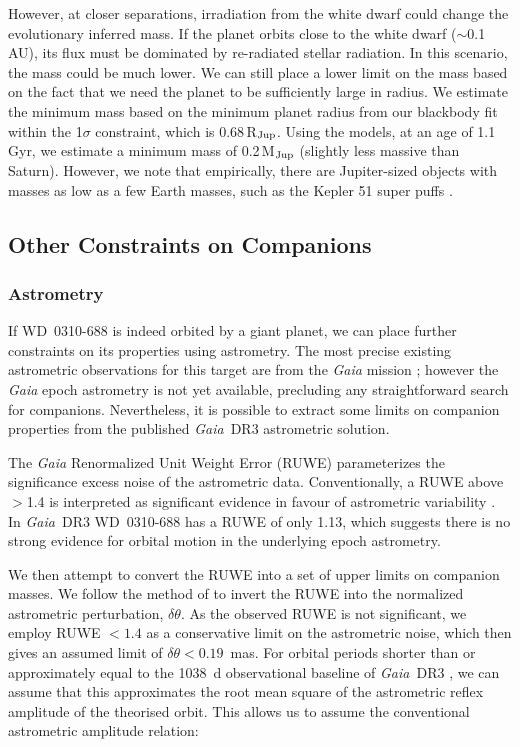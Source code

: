 \documentclass[twocolumn]{aastex631}
\begin{document}
However, at closer separations, irradiation from the white dwarf could change the evolutionary inferred mass. If the planet orbits close to the white dwarf ($\sim$0.1\,AU), its flux must be dominated by re-radiated stellar radiation. In this scenario, the mass could be much lower. We can still place a lower limit on the mass based on the fact that we need the planet to be sufficiently large in radius. We estimate the minimum mass based on the minimum planet radius from our blackbody fit within the 1$\sigma$ constraint, which is 0.68\,R$_{\rm Jup}$. Using the \cite{2019A&A...623A..85L} models, at an age of 1.1\,Gyr, we estimate a minimum mass of 0.2\,M$_{\rm Jup}$ (slightly less massive than Saturn). However, we note that empirically, there are Jupiter-sized objects with masses as low as a few Earth masses, such as the Kepler 51 super puffs \citep{2014ApJ...783...53M,2020AJ....159...57L}.



 

\subsection{Other Constraints on Companions}

\subsubsection{Astrometry}

If WD~0310-688 is indeed orbited by a giant planet, we can place further constraints on its properties using astrometry. The most precise existing astrometric observations for this target are from the \textit{Gaia} mission \citep{Gaia}; however the \textit{Gaia} epoch astrometry is not yet available, precluding any straightforward search for companions. Nevertheless, it is possible to extract some limits on companion properties from the published \textit{Gaia}~DR3 astrometric solution.

The \textit{Gaia} Renormalized Unit Weight Error (RUWE) parameterizes the significance excess noise of the astrometric data. Conventionally, a RUWE above $>$1.4 is interpreted as significant evidence in favour of astrometric variability \citep{Lindegren18}. In \textit{Gaia}~DR3 WD~0310-688 has a RUWE of only 1.13, which suggests there is no strong evidence for orbital motion in the underlying epoch astrometry.

We then attempt to convert the RUWE into a set of upper limits on companion masses. We follow the method of \citep{Belokurov20, Korol22} to invert the RUWE into the normalized astrometric perturbation, $\delta\theta$. As the observed RUWE is not significant, we employ RUWE $<1.4$ as a conservative limit on the astrometric noise, which then gives an assumed limit of $\delta\theta<0.19$~mas. For orbital periods shorter than or approximately equal to the 1038~d observational baseline of \textit{Gaia}~DR3 \citep{Lindegren21}, we can assume that this approximates the root mean square of the astrometric reflex amplitude of the theorised orbit. This allows us to assume the conventional astrometric amplitude relation:
\end{document}
